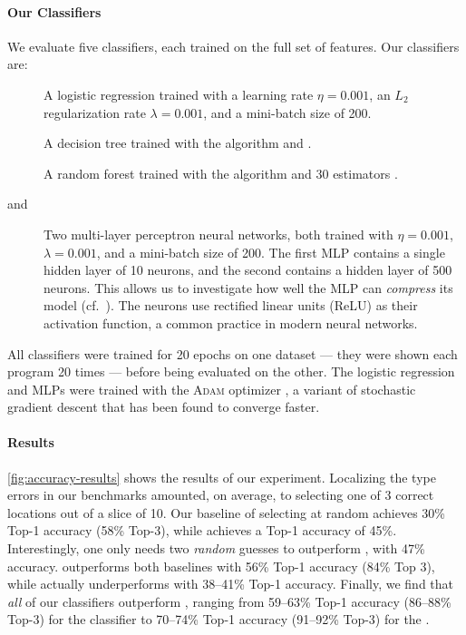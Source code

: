 \paragraph{Our Classifiers}
We evaluate five classifiers, each trained on the full set of features.
%
%
Our classifiers are:
%
\begin{description}
\item[\linear] A logistic regression trained with a learning rate
  $\eta = 0.001$, an $L_2$ regularization rate $\lambda = 0.001$, and a
  mini-batch size of 200.
\item[\dectree] A decision tree trained with the  algorithm and .
\item[\forest] A random forest trained with the  algorithm and 30 estimators .
\item[\hiddenT and \hiddenFH] Two multi-layer perceptron neural networks, both trained with $\eta = 0.001$,
  $\lambda = 0.001$, and a mini-batch size of 200. The first MLP
  contains a single hidden layer of 10 neurons, and the second contains
  a hidden layer of 500 neurons. This allows us to investigate how well
  the MLP can \emph{compress} its model (cf.~\cite{FIXME}). The neurons
  use rectified linear units (ReLU) as their activation function, a
  common practice in modern neural networks.
\end{description}
%
All classifiers were trained for 20 epochs on one dataset
--- \ie they were shown each program 20 times ---
before being evaluated on the other.
%
The logistic regression and MLPs were trained with the \textsc{Adam}
optimizer \citep{Kingma2014-ng}, a variant of stochastic gradient
descent that has been found to converge faster.



\paragraph{Results}
\autoref{fig:accuracy-results} shows the results of our experiment.
%
Localizing the type errors in our benchmarks amounted, on average, to
selecting one of 3 correct locations out of a slice of 10.
%
Our baseline of selecting at random achieves 30\% Top-1
accuracy (58\% Top-3), while \ocaml achieves a Top-1 accuracy of 45\%.
%
Interestingly, one only needs two \emph{random} guesses to outperform
\ocaml, with 47\% accuracy.
%
\sherrloc outperforms both baselines with 56\% Top-1 accuracy (84\% Top
3), while \mycroft actually underperforms \ocaml with 38--41\% Top-1
accuracy.
%
Finally, we find that \emph{all} of our classifiers outperform \sherrloc,
ranging from 59--63\% Top-1 accuracy (86--88\% Top-3) for the \linear
classifier to 70--74\% Top-1 accuracy (91--92\% Top-3) for the \hiddenFH.

